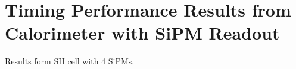 \section{Timing Performance Results from Calorimeter with SiPM Readout}
\label{sec:beamtiming}

Results form SH cell with 4 SiPMs.
